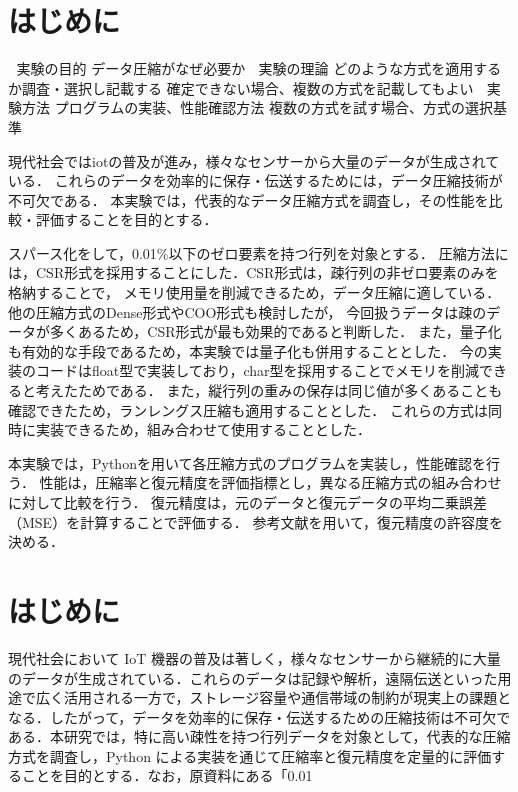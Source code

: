 \section*{はじめに}

 実験の目的
    データ圧縮がなぜ必要か
 実験の理論
    どのような方式を適用するか調査・選択し記載する
    確定できない場合、複数の方式を記載してもよい
 実験方法
    プログラムの実装、性能確認方法
    複数の方式を試す場合、方式の選択基準


現代社会ではiotの普及が進み，様々なセンサーから大量のデータが生成されている．
これらのデータを効率的に保存・伝送するためには，データ圧縮技術が不可欠である．
本実験では，代表的なデータ圧縮方式を調査し，その性能を比較・評価することを目的とする．

スパース化をして，0.01\%以下のゼロ要素を持つ行列を対象とする．
圧縮方法には，CSR形式を採用することにした．CSR形式は，疎行列の非ゼロ要素のみを格納することで，
メモリ使用量を削減できるため，データ圧縮に適している．他の圧縮方式のDense形式やCOO形式も検討したが，
今回扱うデータは疎のデータが多くあるため，CSR形式が最も効果的であると判断した．
また，量子化も有効的な手段であるため，本実験では量子化も併用することとした．
今の実装のコードはfloat型で実装しており，char型を採用することでメモリを削減できると考えたためである．
また，縦行列の重みの保存は同じ値が多くあることも確認できたため，ランレングス圧縮も適用することとした．
これらの方式は同時に実装できるため，組み合わせて使用することとした．

本実験では，Pythonを用いて各圧縮方式のプログラムを実装し，性能確認を行う．
性能は，圧縮率と復元精度を評価指標とし，異なる圧縮方式の組み合わせに対して比較を行う．
復元精度は，元のデータと復元データの平均二乗誤差（MSE）を計算することで評価する．
参考文献を用いて，復元精度の許容度を決める．




\section*{はじめに}
現代社会において IoT 機器の普及は著しく，様々なセンサーから継続的に大量のデータが生成されている．これらのデータは記録や解析，遠隔伝送といった用途で広く活用される一方で，ストレージ容量や通信帯域の制約が現実上の課題となる．したがって，データを効率的に保存・伝送するための圧縮技術は不可欠である．本研究では，特に高い疎性を持つ行列データを対象として，代表的な圧縮方式を調査し，Python による実装を通じて圧縮率と復元精度を定量的に評価することを目的とする．なお，原資料にある「0.01%

